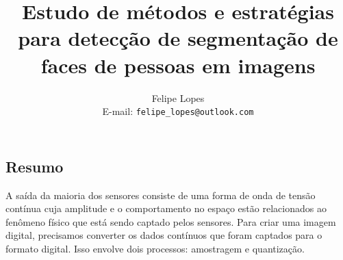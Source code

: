 \documentclass[a4paper,11pt]{article}
\title{Estudo de métodos e estratégias para detecção de segmentação de faces de pessoas em imagens}
\author{Felipe Lopes\\E-mail: {\tt felipe\_lopes@outlook.com}}
\date{}
\begin{document}
\graphicspath{ {imgResumo/} }
\maketitle

\begin{multicols}{2}
\section{Resumo}
A saída da maioria dos sensores consiste de uma forma de onda de tensão contínua cuja amplitude e o comportamento no espaço estão relacionados ao fenômeno físico que está sendo captado pelos sensores. Para criar uma imagem digital, precisamos converter os dados contínuos que foram captados para o formato digital. Isso envolve dois processos: amostragem e quantização.


\end{multicols}
\end{document}

